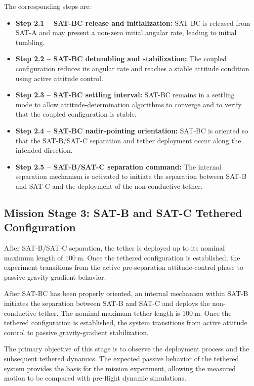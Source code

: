 The corresponding steps are:

\begin{itemize}
    \item \textbf{Step 2.1 -- SAT-BC release and initialization:} SAT-BC is released from SAT-A and may present a non-zero initial angular rate, leading to initial tumbling.

    \item \textbf{Step 2.2 -- SAT-BC detumbling and stabilization:} The coupled configuration reduces its angular rate and reaches a stable attitude condition using active attitude control.

    \item \textbf{Step 2.3 -- SAT-BC settling interval:} SAT-BC remains in a settling mode to allow attitude-determination algorithms to converge and to verify that the coupled configuration is stable.

    \item \textbf{Step 2.4 -- SAT-BC nadir-pointing orientation:} SAT-BC is oriented so that the SAT-B/SAT-C separation and tether deployment occur along the intended direction.

    \item \textbf{Step 2.5 -- SAT-B/SAT-C separation command:} The internal separation mechanism is activated to initiate the separation between SAT-B and SAT-C and the deployment of the non-conductive tether.
\end{itemize}

\subsection{Mission Stage 3: SAT-B and SAT-C Tethered Configuration}
\label{sub:conops_stage3_tethered}

After SAT-B/SAT-C separation, the tether is deployed up to its nominal maximum length of \(100~\mathrm{m}\). Once the tethered configuration is established, the experiment transitions from the active pre-separation attitude-control phase to passive gravity-gradient behavior.

After SAT-BC has been properly oriented, an internal mechanism within SAT-B initiates the separation between SAT-B and SAT-C and deploys the non-conductive tether. The nominal maximum tether length is \(100~\mathrm{m}\). Once the tethered configuration is established, the system transitions from active attitude control to passive gravity-gradient stabilization.

The primary objective of this stage is to observe the deployment process and the subsequent tethered dynamics. The expected passive behavior of the tethered system provides the basis for the mission experiment, allowing the measured motion to be compared with pre-flight dynamic simulations.


